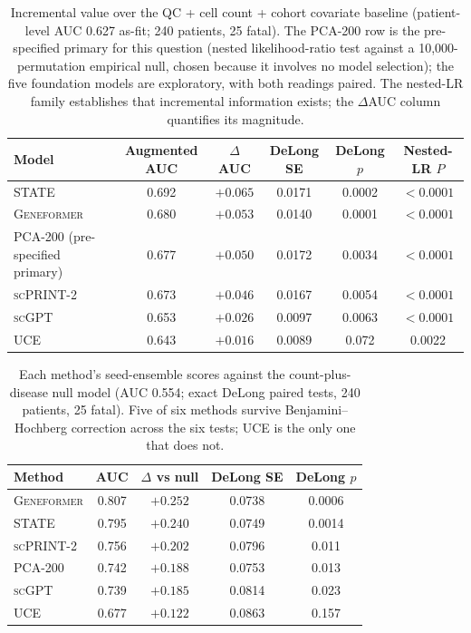 \documentclass[11pt,a4paper]{article}
\newcommand{\model}[1]{\textsc{#1}}
\begin{document}
\begin{table}[t]
\centering
\caption{Incremental value over the QC + cell count + cohort covariate
baseline (patient-level AUC 0.627 as-fit; 240 patients, 25 fatal). The
PCA-200 row is the pre-specified primary for this question (nested
likelihood-ratio test against a 10{,}000-permutation empirical null, chosen
because it involves no model selection); the five foundation models are
exploratory, with both readings paired. The nested-LR family establishes
that incremental information exists; the $\Delta$AUC column quantifies its
magnitude.}
\label{tab:incremental_value}
\small
\begin{tabular}{lccccc}
\toprule
\textbf{Model} & \textbf{Augmented AUC} & \textbf{$\Delta$AUC} & \textbf{DeLong SE} & \textbf{DeLong $p$} & \textbf{Nested-LR $P$} \\
\midrule
\model{STATE} & 0.692 & $+0.065$ & 0.0171 & 0.0002 & $<0.0001$ \\
\model{Geneformer} & 0.680 & $+0.053$ & 0.0140 & 0.0001 & $<0.0001$ \\
PCA-200 (pre-specified primary) & 0.677 & $+0.050$ & 0.0172 & 0.0034 & $<0.0001$ \\
\model{scPRINT-2} & 0.673 & $+0.046$ & 0.0167 & 0.0054 & $<0.0001$ \\
\model{scGPT} & 0.653 & $+0.026$ & 0.0097 & 0.0063 & $<0.0001$ \\
\model{UCE} & 0.643 & $+0.016$ & 0.0089 & 0.072 & 0.0022 \\
\bottomrule
\end{tabular}
\end{table}

\begin{table}[t]
\centering
\caption{Each method's seed-ensemble scores against the count-plus-disease
null model (AUC 0.554; exact DeLong paired tests, 240 patients, 25 fatal).
Five of six methods survive Benjamini--Hochberg correction across the six
tests; \model{UCE} is the only one that does not.}
\label{tab:method_vs_null}
\small
\begin{tabular}{lcccc}
\toprule
\textbf{Method} & \textbf{AUC} & \textbf{$\Delta$ vs null} & \textbf{DeLong SE} & \textbf{DeLong $p$} \\
\midrule
\model{Geneformer} & 0.807 & $+0.252$ & 0.0738 & 0.0006 \\
\model{STATE} & 0.795 & $+0.240$ & 0.0749 & 0.0014 \\
\model{scPRINT-2} & 0.756 & $+0.202$ & 0.0796 & 0.011 \\
PCA-200 & 0.742 & $+0.188$ & 0.0753 & 0.013 \\
\model{scGPT} & 0.739 & $+0.185$ & 0.0814 & 0.023 \\
\model{UCE} & 0.677 & $+0.122$ & 0.0863 & 0.157 \\
\bottomrule
\end{tabular}
\end{table}
\end{document}
